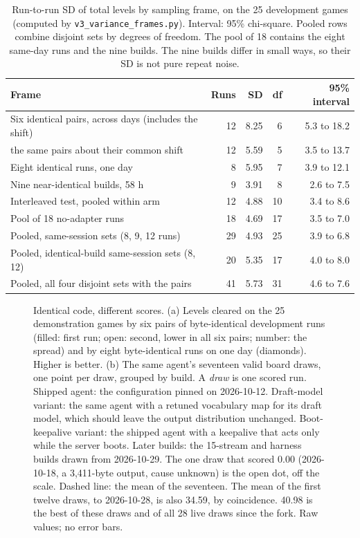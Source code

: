 \begin{table}[t]
\caption{Run-to-run SD of total levels by sampling frame, on the 25 development games (computed by \texttt{v3\_variance\_frames.py}). Interval: 95\% chi-square. Pooled rows combine disjoint sets by degrees of freedom. The pool of 18 contains the eight same-day runs and the nine builds. The nine builds differ in small ways, so their SD is not pure repeat noise.}\label{tab:sdframes} %
\centering\footnotesize
\begin{tabular}{@{}lrrrr@{}}
\toprule
Frame & Runs & SD & df & 95\% interval \\
\midrule
Six identical pairs, across days (includes the shift) & 12 & 8.25 & 6 & 5.3 to 18.2 \\
\quad the same pairs about their common shift & 12 & 5.59 & 5 & 3.5 to 13.7 \\
Eight identical runs, one day & 8 & 5.95 & 7 & 3.9 to 12.1 \\
Nine near-identical builds, 58 h & 9 & 3.91 & 8 & 2.6 to 7.5 \\
Interleaved test, pooled within arm & 12 & 4.88 & 10 & 3.4 to 8.6 \\
Pool of 18 no-adapter runs & 18 & 4.69 & 17 & 3.5 to 7.0 \\
\midrule
Pooled, same-session sets (8, 9, 12 runs) & 29 & 4.93 & 25 & 3.9 to 6.8 \\
Pooled, identical-build same-session sets (8, 12) & 20 & 5.35 & 17 & 4.0 to 8.0 \\
Pooled, all four disjoint sets with the pairs & 41 & 5.73 & 31 & 4.6 to 7.6 \\
\bottomrule
\end{tabular}
\end{table}

\begin{figure}[t]
\centering
{}
\caption{Identical code, different scores. (a) Levels cleared on the 25 demonstration games by six pairs of byte-identical development runs (filled: first run; open: second, lower in all six pairs; number: the spread) and by eight byte-identical runs on one day (diamonds). Higher is better. (b) The same agent's seventeen valid board draws, one point per draw, grouped by build. A \emph{draw} is one scored run. Shipped agent: the configuration pinned on 2026-10-12. Draft-model variant: the same agent with a retuned vocabulary map for its draft model, which should leave the output distribution unchanged. Boot-keepalive variant: the shipped agent with a keepalive that acts only while the server boots. Later builds: the 15-stream and harness builds drawn from 2026-10-29. The one draw that scored 0.00 (2026-10-18, a 3,411-byte output, cause unknown) is the open dot, off the scale. Dashed line: the mean of the seventeen. The mean of the first twelve draws, to 2026-10-28, is also 34.59, by coincidence. 40.98 is the best of these draws and of all 28 live draws since the fork. Raw values; no error bars.}\label{fig:noise} %
\end{figure}


